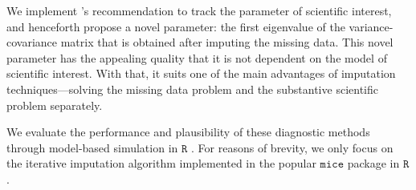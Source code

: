 \documentclass{article}
\begin{document}
We implement \cite{buur18}'s recommendation to track the parameter of scientific interest, and henceforth propose a novel parameter: the first eigenvalue of the variance-covariance matrix that is obtained after imputing the missing data. This novel parameter has the appealing quality that it is not dependent on the model of scientific interest. With that, it suits one of the main advantages of imputation techniques---solving the missing data problem and the substantive scientific problem separately.



% 
% 

We evaluate the performance and plausibility of these diagnostic methods through model-based simulation in $\mathtt{R}$ \cite{R}. For reasons of brevity, we only focus on the iterative imputation algorithm implemented in the popular $\mathtt{mice}$ package in $\mathtt{R}$ \citep{mice}. 
\end{document}

